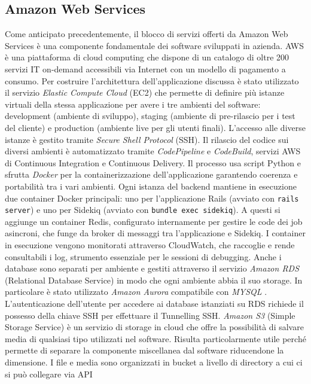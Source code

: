 \documentclass[target=bach,aauheader=,style=]{thud}
\begin{document}
\subsection{Amazon Web Services}

Come anticipato precedentemente, il blocco di servizi offerti da Amazon Web Services è una componente fondamentale dei software sviluppati in azienda.
AWS è una piattaforma di cloud computing che dispone di un catalogo di oltre 200 servizi IT on-demand accessibili via Internet con un modello di pagamento a consumo. Per costruire l'architettura
dell'applicazione discussa è stato utilizzato il servizio \textit{Elastic Compute Cloud} (EC2) che permette di definire più istanze virtuali della stessa applicazione per avere i tre ambienti del software:
development (ambiente di sviluppo), staging (ambiente di pre-rilascio per i test del cliente) e production (ambiente live per gli utenti finali). L'accesso alle diverse istanze è gestito tramite
\textit{Secure Shell Protocol} \cite{rfc4251} (SSH). Il rilascio del codice sui diversi ambienti è automatizzato tramite \textit{CodePipeline} e \textit{CodeBuild}, servizi AWS di Continuous Integration
e Continuous Delivery. Il processo usa script Python e sfrutta \textit{Docker} \cite{docker} per la containerizzazione dell'applicazione garantendo coerenza e portabilità tra i vari ambienti.
Ogni istanza del backend mantiene in esecuzione due container Docker principali: uno per l'applicazione Rails (avviato con \texttt{rails server}) e uno per Sidekiq (avviato con \texttt{bundle exec sidekiq}). A questi si
aggiunge un container Redis, configurato internamente per gestire le code dei job asincroni, che funge da broker di messaggi tra l'applicazione e Sidekiq.
I container in esecuzione vengono monitorati attraverso CloudWatch, che raccoglie e rende consultabili i log, strumento essenziale per le sessioni di debugging.
Anche i database sono separati per ambiente e gestiti attraverso il servizio \textit{Amazon RDS} (Relational Database Service) in modo che ogni ambiente abbia il suo storage. In particolare è stato
utilizzato \textit{Amazon Aurora} compatibile con \textit{MYSQL} \cite{mysql}. L'autenticazione dell'utente per accedere ai database istanziati su RDS richiede il possesso della chiave SSH per effettuare il Tunnelling SSH.
\textit{Amazon S3} (Simple Storage Service) è un servizio di storage in cloud che offre la possibilità di salvare media di qualsiasi tipo utilizzati nel software. Risulta particolarmente utile
perché permette di separare la componente miscellanea dal software riducendone la dimensione. I file e media sono organizzati in bucket a livello di directory a cui ci si può collegare via API
\end{document}
